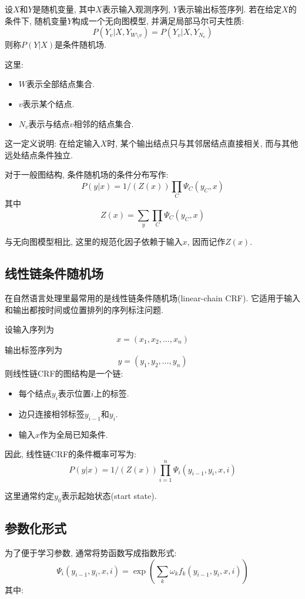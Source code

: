 设$X$和$Y$是随机变量, 其中$X$表示输入观测序列, $Y$表示输出标签序列.
若在给定$X$的条件下, 随机变量$Y$构成一个无向图模型, 并满足局部马尔可夫性质:
\[
P(Y_v | X, Y_{W \setminus v}) = P(Y_v | X, Y_{N_v})
\]
则称$P(Y|X)$是条件随机场.

这里:

\begin{itemize}
\item $W$表示全部结点集合.
\item $v$表示某个结点.
\item $N_v$表示与结点$v$相邻的结点集合.
\end{itemize}

这一定义说明: 在给定输入$X$时, 某个输出结点只与其邻居结点直接相关, 而与其他远处结点条件独立.

对于一般图结构, 条件随机场的条件分布写作:
\[
P(y|x) = 1/(Z(x)) \prod_C \Psi_C (y_C, x)
\]
其中
\[
Z(x) = \sum_y \prod_C \Psi_C (y_C, x)
\]

与无向图模型相比, 这里的规范化因子依赖于输入$x$, 因而记作$Z(x)$.

\subsection{线性链条件随机场}


在自然语言处理里最常用的是线性链条件随机场(linear-chain CRF).
它适用于输入和输出都按时间或位置排列的序列标注问题.

设输入序列为
\[
x = (x_1, x_2, \dots, x_n)
\]
输出标签序列为
\[
y = (y_1, y_2, \dots, y_n)
\]
则线性链CRF的图结构是一个链:

\begin{itemize}
\item 每个结点$y_i$表示位置$i$上的标签.
\item 边只连接相邻标签$y_{i-1}$和$y_i$.
\item 输入$x$作为全局已知条件.
\end{itemize}

因此, 线性链CRF的条件概率可写为:
\[
P(y|x) = 1/(Z(x)) \prod_{i=1}^n \Psi_i (y_{i-1}, y_i, x, i)
\]

这里通常约定$y_0$表示起始状态(start state).

\subsection{参数化形式}


为了便于学习参数, 通常将势函数写成指数形式:
\[
\Psi_i (y_{i-1}, y_i, x, i)
    = \exp(\sum_k \omega_k f_k (y_{i-1}, y_i, x, i))
\]
其中:

